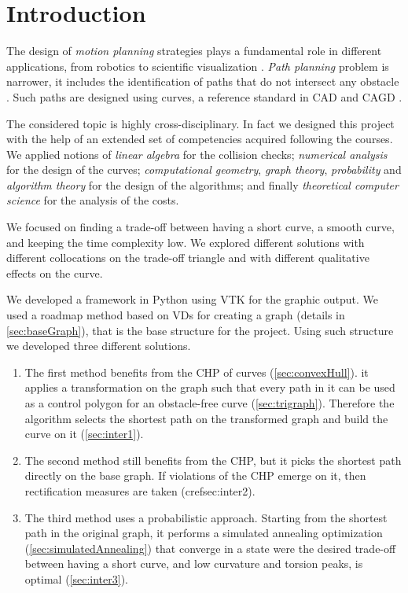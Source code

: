 \documentclass[dissertation.tex]{subfiles}
\begin{document}
\chapter{Introduction}
The design of \emph{motion planning} strategies plays a fundamental
role in different applications, from robotics to scientific
visualization \cite{giannelli}. \emph{Path planning} problem is
narrower, it includes the identification of paths that do not
intersect any obstacle \cite{giannelli}. Such paths are designed using
\bs curves, a reference standard in \ac{CAD} and \ac{CAGD}
\cite{hughes}\cite{foley}.

The considered topic is highly cross-disciplinary. In fact we designed
this project with the help of an extended set of
competencies acquired following the courses. We applied notions of
\emph{linear algebra} for the collision checks; \emph{numerical
  analysis} for the design of the curves; \emph{computational
  geometry},
\emph{graph theory}, \emph{probability} and \emph{algorithm theory}
for the design of the 
algorithms; and finally \emph{theoretical computer science} for the
analysis of the costs.

We focused on finding a trade-off between having a short curve, a
smooth curve, and keeping the time complexity low. We explored
different solutions with different collocations on the trade-off
triangle and with different qualitative effects on the curve.

We developed a framework in Python using \ac{VTK} for the graphic
output. We used a roadmap method based on \acp{VD} for creating a
graph (details in
\cref{sec:baseGraph}), that is the base
structure for the project. Using such structure we developed three
different solutions.
\begin{enumerate}
\item The first method benefits from the \acf{CHP} of \bs
  curves (\cref{sec:convexHull}). it applies a transformation on the
  graph such that every path in it can be used as a control polygon
  for an obstacle-free curve (\cref{sec:trigraph}). Therefore the
  algorithm selects the shortest path on the transformed graph and
  build the curve on it (\cref{sec:inter1}).
\item The second method still benefits from the \ac{CHP},
  but it picks the shortest path directly on the base graph. If
  violations of the \ac{CHP} emerge on it, then rectification
  measures are taken (cref{sec:inter2}).
\item The third method uses a probabilistic approach. Starting from
  the shortest path in the original graph, it performs a simulated
  annealing optimization (\cref{sec:simulatedAnnealing}) that converge
  in a state were the desired trade-off between having a short curve,
  and low curvature
  and torsion peaks, is optimal (\cref{sec:inter3}).
\end{enumerate}
\end{document}
